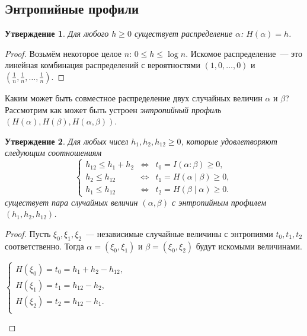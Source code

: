 \documentclass[12pt]{article}
\theoremstyle{definition}
\theoremstyle{plain}
\newtheorem{statement}{Утверждение}[section]
\theoremstyle{remark}
\begin{document}
\subsection{Энтропийные профили}
\begin{statement}
    Для любого $h\ge 0$ существует распределение $\alpha$: $H(\alpha) = h$. 
\end{statement}
\begin{proof}
    Возьмём некоторое целое $n$: $0\le h\le\log n$. Искомое распределение~---
    это линейная комбинация распределений с вероятностями $(1, 0, \dotsc, 0)$
    и $(\frac1n, \frac1n,\dotsc,\frac1n)$.
\end{proof}

Каким может быть совместное распределение двух случайных величин
$\alpha$ и $\beta$? Рассмотрим как может быть устроен \emph{энтропийный
профиль} $(H(\alpha), H(\beta), H(\alpha,\beta))$. 

\begin{statement}
    Для любых чисел $h_1, h_2, h_{12}\ge 0$, которые удовлетворяют следующим
    соотношениям
\[
    \left\{
    \begin{array}{lll}
        h_{12} \le h_1 + h_2 & \iff & t_0 = I(\alpha:\beta)\ge 0,\\
        h_{2} \le h_{12}     & \iff & t_1 = H(\alpha\mid\beta)\ge 0,\\
        h_{1} \le h_{12}     & \iff & t_2 = H(\beta\mid\alpha)\ge 0.
    \end{array}
    \right.
\]
    существует пара случайных величин $(\alpha,\beta)$ с энтропийным профилем $(h_1, h_2, h_{12})$.
\end{statement}
\begin{proof}
    Пусть $\xi_0,\xi_1,\xi_2$~--- независимые случайные величины с энтропиями
    $t_0,t_1,t_2$ соответственно. Тогда $\alpha=(\xi_0,\xi_1)$ и
    $\beta=(\xi_0,\xi_2)$ будут искомыми величинами.  
    \begin{center}
    
        \parbox{.4\textwidth}{
        \(
        \begin{cases}
            H(\xi_0) = t_0 = h_1 + h_2 - h_{12},\\
            H(\xi_1) = t_1 = h_{12} - h_{2},\\
            H(\xi_2) = t_2 = h_{12} - h_{1}.\\
        \end{cases}
        \)}
    \parbox{.4\textwidth}{}
    \end{center}
\end{proof}
\end{document}

